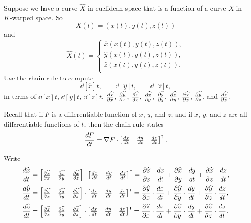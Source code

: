 \documentclass{ximera}
\begin{document}
\begin{problem}
  Suppose we have a curve $\hat X$ in euclidean space that is a
  function of a curve $X$ in $K$-warped space. So
  \[
  X(t) = (x(t),y(t),z(t))
  \]
  and
  \[
  \hat{X}(t)=
  \begin{cases}
    \hat x(x(t), y(t), z(t)),\\
    \hat y(x(t), y(t), z(t)),\\
    \hat z(x(t), y(t), z(t)).\\
  \end{cases}
  \]
  Use the chain rule to compute
  \[
  \dd[\hat x]{t}, \qquad \dd[\hat y]{t}, \qquad \dd[\hat z]{t},
  \]
  in terms of $\dd[x]{t}$, $\dd[y]{t}$, $\dd[z]{t}$, $\pp[\hat x]{x}$, $\pp[\hat y]{x}$, $\pp[\hat z]{x}$,
  $\pp[\hat x]{y}$, $\pp[\hat y]{y}$, $\pp[\hat z]{y}$, $\pp[\hat x]{z}$, $\pp[\hat y]{z}$, and $\pp[\hat z]{z}$. 
  \begin{hint}
    Recall that if $F$ is a differentiable function of $x$, $y$, and
    $z$; and if $x$, $y$, and $z$ are all differentiable functions of
    $t$, then the chain rule states
    \[
    \dd[F]{t} = \nabla F \cdot
    \begin{bmatrix}
      \dd[x]{t} & \dd[y]{t} & \dd[z]{t}
    \end{bmatrix}^\transpose.
    \]
  \end{hint}
  \begin{freeResponse}
    Write
    \begin{align*}
      \dd[\hat x]{t} &= \begin{bmatrix} \pp[\hat x]{x} & \pp[\hat x]{y} & \pp[\hat x]{z} \end{bmatrix} \cdot \begin{bmatrix} \dd[x]{t} & \dd[y]{t} & \dd[z]{t} \end{bmatrix}^\transpose
      = \pp[\hat x]{x}\cdot\dd[x]{t} + \pp[\hat x]{y}\cdot\dd[y]{t} + \pp[\hat x]{z}\cdot\dd[z]{t}, \\
      \dd[\hat y]{t} &= \begin{bmatrix} \pp[\hat y]{x} & \pp[\hat y]{y} & \pp[\hat y]{z} \end{bmatrix} \cdot \begin{bmatrix} \dd[x]{t} & \dd[y]{t} & \dd[z]{t} \end{bmatrix}^\transpose
      = \pp[\hat y]{x}\cdot\dd[x]{t} + \pp[\hat y]{y}\cdot\dd[y]{t} + \pp[\hat y]{z}\cdot\dd[z]{t}, \\
      \dd[\hat z]{t} &= \begin{bmatrix} \pp[\hat z]{x} & \pp[\hat z]{y} & \pp[\hat z]{z} \end{bmatrix} \cdot \begin{bmatrix} \dd[x]{t} & \dd[y]{t} & \dd[z]{t} \end{bmatrix}^\transpose
      = \pp[\hat z]{x}\cdot\dd[x]{t} + \pp[\hat z]{y}\cdot\dd[y]{t} + \pp[\hat z]{z}\cdot\dd[z]{t}.
    \end{align*}
  \end{freeResponse}
\end{problem}
\end{document}
